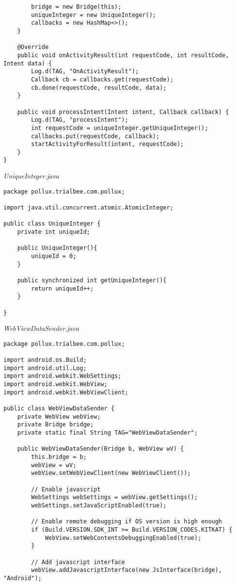 \begin{appendices}
\begin{lstlisting}
        bridge = new Bridge(this);
        uniqueInteger = new UniqueInteger();
        callbacks = new HashMap<>();
    }

    @Override
    public void onActivityResult(int requestCode, int resultCode, Intent data) {
        Log.d(TAG, "OnActivityResult");
        Callback cb = callbacks.get(requestCode);
        cb.done(requestCode, resultCode, data);
    }

    public void processIntent(Intent intent, Callback callback) {
        Log.d(TAG, "processIntent");
        int requestCode = uniqueInteger.getUniqueInteger();
        callbacks.put(requestCode, callback);
        startActivityForResult(intent, requestCode);
    }
}
\end{lstlisting}
\emph{UniqueInteger.java}
\begin{lstlisting}
package pollux.trialbee.com.pollux;

import java.util.concurrent.atomic.AtomicInteger;

public class UniqueInteger {
    private int uniqueId;

    public UniqueInteger(){
        uniqueId = 0;
    }

    public synchronized int getUniqueInteger(){
        return uniqueId++;
    }

}
\end{lstlisting}
\emph{WebViewDataSender.java}
\begin{lstlisting}
package pollux.trialbee.com.pollux;

import android.os.Build;
import android.util.Log;
import android.webkit.WebSettings;
import android.webkit.WebView;
import android.webkit.WebViewClient;

public class WebViewDataSender {
    private WebView webView;
    private Bridge bridge;
    private static final String TAG="WebViewDataSender";

    public WebViewDataSender(Bridge b, WebView wV) {
        this.bridge = b;
        webView = wV;
        webView.setWebViewClient(new WebViewClient());

        // Enable javascript
        WebSettings webSettings = webView.getSettings();
        webSettings.setJavaScriptEnabled(true);

        // Enable remote debugging if OS version is high enough
        if (Build.VERSION.SDK_INT >= Build.VERSION_CODES.KITKAT) {
            WebView.setWebContentsDebuggingEnabled(true);
        }

        // Add javascript interface
        webView.addJavascriptInterface(new JsInterface(bridge), "Android");


\end{lstlisting}
\end{appendices}

